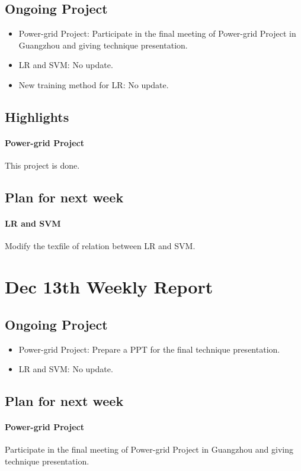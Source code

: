 \documentclass[10pt]{amsart}
\begin{document}
\subsection{Ongoing Project}
\begin{itemize}
	\item Power-grid Project: Participate in the final meeting of Power-grid Project in Guangzhou and  giving technique presentation.
	\item LR and SVM: No update. 
	\item New training method for LR: No update.
	
\end{itemize}

\subsection{Highlights}
\paragraph{Power-grid Project}
This project is done.


\subsection{Plan for next week}
\paragraph{LR and SVM}
Modify the texfile of relation between LR and SVM.

\section{Dec 13th Weekly Report} %

\subsection{Ongoing Project}
\begin{itemize}
	\item Power-grid Project: Prepare a PPT for the final technique presentation.
	\item LR and SVM: No update. 

\end{itemize}


\subsection{Plan for next week}
\paragraph{Power-grid Project}
Participate in the final meeting of Power-grid Project in Guangzhou and  giving technique presentation.
\end{document}
